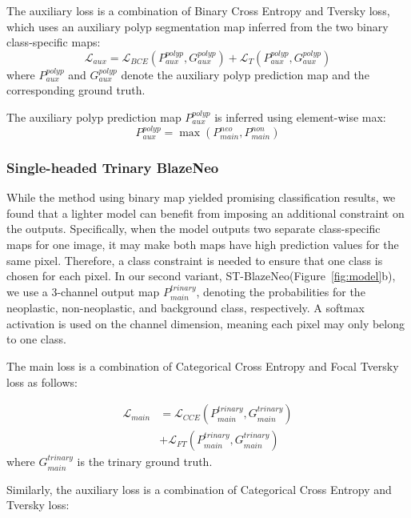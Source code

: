 \documentclass{ieeeaccess}
\newcommand{\ModelName}{BlazeNeo\xspace}
\begin{document}
The auxiliary loss is a combination of Binary Cross Entropy and Tversky loss, which uses an auxiliary polyp segmentation map inferred from the two binary class-specific maps:
\begin{equation}
    \label{eq:aux_loss_sb}
    \mathcal{L}_{aux} =  \mathcal{L}_{BCE}(P_{aux}^{polyp}, G_{aux}^{polyp}) + \mathcal{L}_{T}(P_{aux}^{polyp}, G_{aux}^{polyp})
\end{equation}
where $P_{aux}^{polyp}$ and $G_{aux}^{polyp}$ denote the auxiliary polyp prediction map and the corresponding ground truth.

The auxiliary polyp prediction map $P_{aux}^{polyp}$ is inferred using element-wise max:
\begin{equation}
    P_{aux}^{polyp} = \max(P_{main}^{neo}, P_{main}^{non})
    \label{eq:mapconvert}
\end{equation}



\subsubsection{Single-headed Trinary \ModelName}
While the method using binary map \cite{lan2021neounet} yielded promising classification results, we found that a lighter model can benefit from imposing an additional constraint on the outputs.
Specifically, when the model outputs two separate class-specific maps for one image, it may make both maps have high prediction values for the same pixel. Therefore, a class constraint is needed to ensure that one class is chosen for each pixel. In our second variant, ST-\ModelName (Figure~\ref{fig:model}b), we use a 3-channel output map $P_{main}^{trinary}$, denoting the probabilities for the neoplastic, non-neoplastic, and background class, respectively. A softmax activation is used on the channel dimension, meaning each pixel may only belong to one class.

The main loss is a combination of Categorical Cross Entropy and Focal Tversky loss as follows:

\begin{align}
    \label{eq:main_loss}
    \mathcal{L}_{main} & = \mathcal{L}_{CCE}(P_{main}^{trinary}, G_{main}^{trinary}) \nonumber \\
                       & + \mathcal{L}_{FT}(P_{main}^{trinary}, G_{main}^{trinary})
\end{align}
where $G_{main}^{trinary}$ is the trinary ground truth.

Similarly, the auxiliary loss is a combination of Categorical Cross Entropy and Tversky loss:
\end{document}
